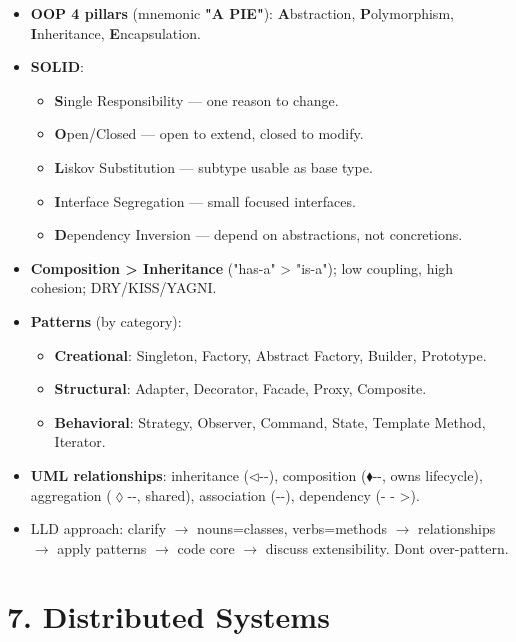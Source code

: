 \documentclass[11pt]{article}
\providecommand{\tightlist}{\setlength{\itemsep}{1pt}\setlength{\parskip}{0pt}}
\begin{document}
\begin{itemize}
\tightlist
\item
  \textbf{OOP 4 pillars} (mnemonic \textbf{"A PIE"}): \textbf{A}bstraction, \textbf{P}olymorphism, \textbf{I}nheritance, \textbf{E}ncapsulation.
\item
  \textbf{SOLID}:

  \begin{itemize}
  \tightlist
  \item
    \textbf{S}ingle Responsibility --- one reason to change.
  \item
    \textbf{O}pen/Closed --- open to extend, closed to modify.
  \item
    \textbf{L}iskov Substitution --- subtype usable as base type.
  \item
    \textbf{I}nterface Segregation --- small focused interfaces.
  \item
    \textbf{D}ependency Inversion --- depend on abstractions, not concretions.
  \end{itemize}
\item
  \textbf{Composition \textgreater{} Inheritance} ("has-a" \textgreater{} "is-a"); low coupling, high cohesion; DRY/KISS/YAGNI.
\item
  \textbf{Patterns} (by category):

  \begin{itemize}
  \tightlist
  \item
    \textbf{Creational}: Singleton, Factory, Abstract Factory, Builder, Prototype.
  \item
    \textbf{Structural}: Adapter, Decorator, Facade, Proxy, Composite.
  \item
    \textbf{Behavioral}: Strategy, Observer, Command, State, Template Method, Iterator.
  \end{itemize}
\item
  \textbf{UML relationships}: inheritance (\(\triangleleft\)-\/-), composition (\(\blacklozenge\)-\/-, owns lifecycle), aggregation (\(\lozenge\)-\/-, shared), association (-\/-), dependency (- - \textgreater).
\item
  LLD approach: clarify \(\rightarrow\) nouns=classes, verbs=methods \(\rightarrow\) relationships \(\rightarrow\) apply patterns \(\rightarrow\) code core \(\rightarrow\) discuss extensibility. Don\textquotesingle t over-pattern.
\end{itemize}

\section{7. Distributed Systems}\label{7-distributed-systems}
\end{document}
